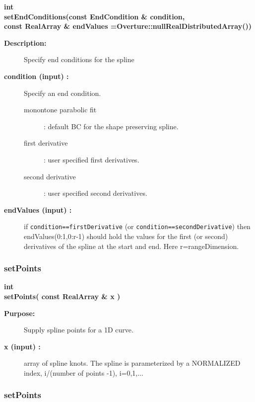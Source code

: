 \begin{flushleft} \textbf{%
int   \\ 
\settowidth{\SplineMappingIncludeArgIndent}{setEndConditions(}%
setEndConditions(const EndCondition \& condition, \\ 
const RealArray \& endValues  =Overture::nullRealDistributedArray())
}\end{flushleft}
\begin{description}
\item[{\bf Description:}] 
   Specify end conditions for the spline
\item[{\bf condition (input) :}]  Specify an end condition.
    \begin{description}
      \item[monontone parabolic fit] : default BC for the shape preserving spline.
      \item[first derivative] : user specified first derivatives.
      \item[second derivative] : user specified second derivatives.
    \end{description}
\item[{\bf endValues (input) :}]  if {\tt condition==firstDerivative} (or {\tt condition==secondDerivative})
  then endValues(0:1,0:r-1) should
  hold the values for the first (or second) derivatives of the spline at the start and end. Here
   r=rangeDimension.
     
\end{description}
\subsubsection{setPoints}
 
\begin{flushleft} \textbf{%
int  \\ 
\settowidth{\SplineMappingIncludeArgIndent}{setPoints(}%
setPoints( const RealArray \& x )
}\end{flushleft}
\begin{description}
\item[{\bf Purpose:}]  Supply spline points for a 1D curve.
\item[{\bf x (input) :}]  array of spline knots.
  The spline is parameterized by a NORMALIZED index, i/(number of points -1), i=0,1,...
\end{description}
\subsubsection{setPoints}
 
